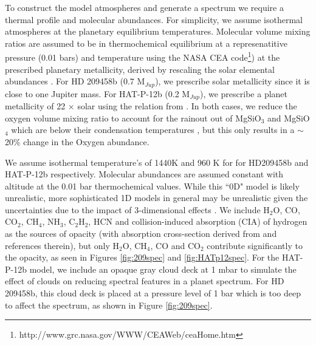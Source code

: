 \documentclass[iop]{emulateapj}
\begin{document}
To construct the model atmospheres and generate a spectrum we require a thermal profile and molecular abundances. For simplicity, we assume isothermal atmospheres at the planetary equilibrium temperatures. Molecular volume mixing ratios are assumed to be in thermochemical equilibrium at a represenatitive pressure (0.01 bars) and temperature using the NASA CEA code\footnote{http://www.grc.nasa.gov/WWW/CEAWeb/ceaHome.htm}\citep{gordon1996cea}) at the prescribed planetary metallicity, derived by rescaling the solar elemental abundances \citep{asplund}.
For HD 209458b (0.7 M$_{Jup}$), we prescribe solar metallicity since it is close to one Jupiter mass.
For HAT-P-12b (0.2 M$_{Jup}$), we prescribe a planet metallicity of 22 $\times$ solar using the relation from \citet{kreidberg2014wasp43}.
In both cases, we reduce the oxygen volume mixing ratio to account for the rainout out of MgSiO$_3$ and MgSiO$_4$ which are below their condensation temperatures \citep{sing2016continuum}, but this only results in a $\sim$ 20\% change in the Oxygen abundance.

We assume isothermal temperature's of 1440K and 960 K for for HD209458b and HAT-P-12b respectively. Molecular abundances are assumed constant with altitude at the 0.01 bar thermochemical values. While this ``0D" model is likely unrealistic, more sophisticated 1D models in general may be unrealistic given the uncertainties due to the impact of 3-dimensional effects \citep[e.g.][]{line2016nonUclouds,feng2016nonUniform}. We include H$_2$O, CO, CO$_2$, CH$_4$, NH$_3$, C$_2$H$_2$, HCN and collision-induced absorption (CIA) of hydrogen as the sources of opacity (with absorption cross-section derived from \citet{freedman2014opacities} and references therein), but only H$_2$O, CH$_4$, CO and CO$_2$ contribute significantly to the opacity, as seen in Figures \ref{fig:209spec} and \ref{fig:HATp12spec}.
For the HAT-P-12b model, we include an opaque gray cloud deck at 1 mbar to simulate the effect of clouds on reducing spectral features in a planet spectrum.
For HD 209458b, this cloud deck is placed at a pressure level of 1 bar which is too deep to affect the spectrum, as shown in Figure \ref{fig:209spec}.
\end{document}

